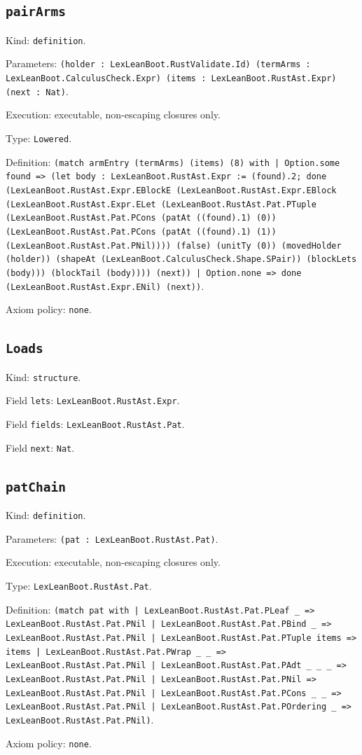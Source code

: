 \documentclass[11pt]{article}
\begin{document}
\subsection*{\texttt{pairArms}}
\noindent Kind: \texttt{definition}.\par
\noindent Parameters: \texttt{(holder : LexLeanBoot.RustValidate.Id) (termArms : LexLeanBoot.CalculusCheck.Expr) (items : LexLeanBoot.RustAst.Expr) (next : Nat)}.\par
\noindent Execution: executable, non-escaping closures only.\par
\noindent Type: \texttt{Lowered}.\par
\noindent Definition: \texttt{(match armEntry (termArms) (items) (8) with | Option.some found => (let body : LexLeanBoot.RustAst.Expr := (found).2; done (LexLeanBoot.RustAst.Expr.EBlockE (LexLeanBoot.RustAst.Expr.EBlock (LexLeanBoot.RustAst.Expr.ELet (LexLeanBoot.RustAst.Pat.PTuple (LexLeanBoot.RustAst.Pat.PCons (patAt ((found).1) (0)) (LexLeanBoot.RustAst.Pat.PCons (patAt ((found).1) (1)) (LexLeanBoot.RustAst.Pat.PNil)))) (false) (unitTy (0)) (movedHolder (holder)) (shapeAt (LexLeanBoot.CalculusCheck.Shape.SPair)) (blockLets (body))) (blockTail (body)))) (next)) | Option.none => done (LexLeanBoot.RustAst.Expr.ENil) (next))}.\par
\noindent Axiom policy: \texttt{none}.\par
\subsection*{\texttt{Loads}}
\noindent Kind: \texttt{structure}.\par
\noindent Field \texttt{lets}: \texttt{LexLeanBoot.RustAst.Expr}.\par
\noindent Field \texttt{fields}: \texttt{LexLeanBoot.RustAst.Pat}.\par
\noindent Field \texttt{next}: \texttt{Nat}.\par
\subsection*{\texttt{patChain}}
\noindent Kind: \texttt{definition}.\par
\noindent Parameters: \texttt{(pat : LexLeanBoot.RustAst.Pat)}.\par
\noindent Execution: executable, non-escaping closures only.\par
\noindent Type: \texttt{LexLeanBoot.RustAst.Pat}.\par
\noindent Definition: \texttt{(match pat with | LexLeanBoot.RustAst.Pat.PLeaf \_ => LexLeanBoot.RustAst.Pat.PNil | LexLeanBoot.RustAst.Pat.PBind \_ => LexLeanBoot.RustAst.Pat.PNil | LexLeanBoot.RustAst.Pat.PTuple items => items | LexLeanBoot.RustAst.Pat.PWrap \_ \_ => LexLeanBoot.RustAst.Pat.PNil | LexLeanBoot.RustAst.Pat.PAdt \_ \_ \_ => LexLeanBoot.RustAst.Pat.PNil | LexLeanBoot.RustAst.Pat.PNil => LexLeanBoot.RustAst.Pat.PNil | LexLeanBoot.RustAst.Pat.PCons \_ \_ => LexLeanBoot.RustAst.Pat.PNil | LexLeanBoot.RustAst.Pat.POrdering \_ => LexLeanBoot.RustAst.Pat.PNil)}.\par
\noindent Axiom policy: \texttt{none}.\par
\end{document}
